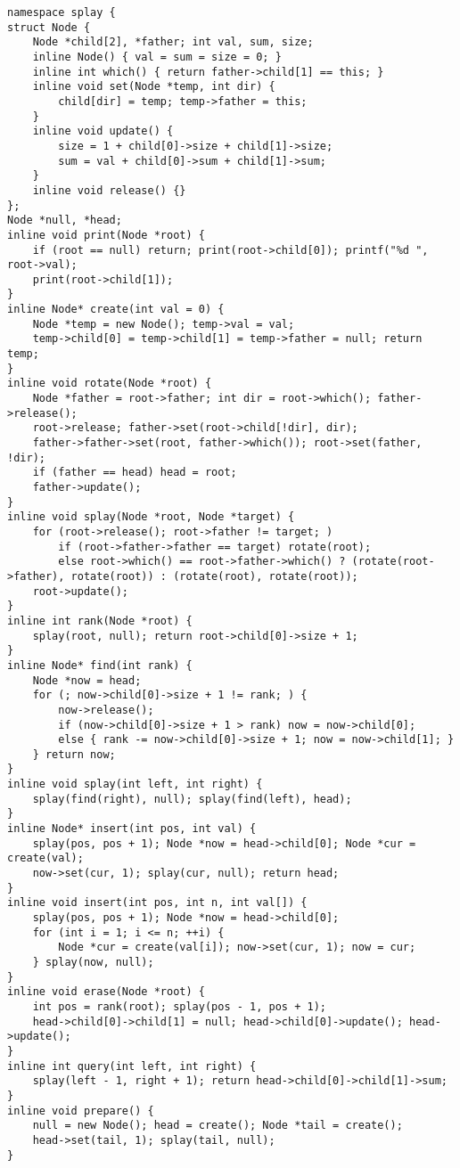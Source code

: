 \begin{lstlisting}
namespace splay {
struct Node {
	Node *child[2], *father; int val, sum, size;
	inline Node() { val = sum = size = 0; }
	inline int which() { return father->child[1] == this; }
	inline void set(Node *temp, int dir) {
		child[dir] = temp; temp->father = this;
	}
	inline void update() {
		size = 1 + child[0]->size + child[1]->size;
		sum = val + child[0]->sum + child[1]->sum;
	}
	inline void release() {}
};
Node *null, *head;
inline void print(Node *root) {
	if (root == null) return; print(root->child[0]); printf("%d ", root->val);
	print(root->child[1]);
}
inline Node* create(int val = 0) {
	Node *temp = new Node(); temp->val = val;
	temp->child[0] = temp->child[1] = temp->father = null; return temp;
}
inline void rotate(Node *root) {
	Node *father = root->father; int dir = root->which(); father->release();
	root->release; father->set(root->child[!dir], dir);
	father->father->set(root, father->which()); root->set(father, !dir);
	if (father == head) head = root;
	father->update();
}
inline void splay(Node *root, Node *target) {
	for (root->release(); root->father != target; )
		if (root->father->father == target) rotate(root);
		else root->which() == root->father->which() ? (rotate(root->father), rotate(root)) : (rotate(root), rotate(root));
	root->update();
}
inline int rank(Node *root) {
	splay(root, null); return root->child[0]->size + 1;
}
inline Node* find(int rank) {
	Node *now = head;
	for (; now->child[0]->size + 1 != rank; ) {
		now->release();
		if (now->child[0]->size + 1 > rank) now = now->child[0];
		else { rank -= now->child[0]->size + 1; now = now->child[1]; }
	} return now;
}
inline void splay(int left, int right) {
	splay(find(right), null); splay(find(left), head);
}
inline Node* insert(int pos, int val) {
	splay(pos, pos + 1); Node *now = head->child[0]; Node *cur = create(val);
	now->set(cur, 1); splay(cur, null); return head;
}
inline void insert(int pos, int n, int val[]) {
	splay(pos, pos + 1); Node *now = head->child[0];
	for (int i = 1; i <= n; ++i) {
		Node *cur = create(val[i]); now->set(cur, 1); now = cur;
	} splay(now, null);
}
inline void erase(Node *root) {
	int pos = rank(root); splay(pos - 1, pos + 1);
	head->child[0]->child[1] = null; head->child[0]->update(); head->update();
}
inline int query(int left, int right) {
	splay(left - 1, right + 1); return head->child[0]->child[1]->sum;
}
inline void prepare() {
	null = new Node(); head = create(); Node *tail = create();
	head->set(tail, 1); splay(tail, null);
}
\end{lstlisting}